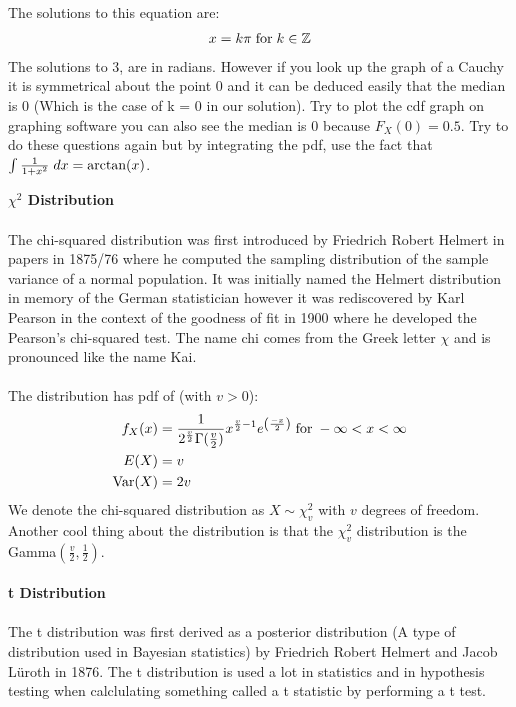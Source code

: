 \documentclass[,oneside]{article}
\begin{document}
\begin{enumerate}
\begin{enumerate}
The solutions to this equation are:
\begin{align*}
x = k\pi \hspace{0.1cm} \text{for} \hspace{0.1cm}k \in \mathbb{Z}
\end{align*}
The solutions to 3, are in radians. However if you look up the graph of a Cauchy it is symmetrical about the point 0 and it can be deduced easily that the median is 0 (Which is the case of k = 0 in our solution). Try to plot the cdf graph on graphing software you can also see the median is 0 because $F_X(0)=0.5$. Try to do these questions again but by integrating the pdf, use the fact that $\int \frac{1}{1+x^2}\hspace{0.1cm}dx=\text{arctan}(x)$.\\
\end{enumerate}
\textbf{$\chi^2$ Distribution}\\ \\
The chi-squared distribution was first introduced by Friedrich Robert Helmert in papers in 1875/76 where he computed the sampling distribution of the sample variance of a normal population. It was initially named the Helmert distribution in memory of the German statistician however it was rediscovered by Karl Pearson in the context of the goodness of fit in 1900 where he developed the Pearson's chi-squared test. The name chi comes from the Greek letter $\chi$ and is pronounced like the name Kai.\\ \\
The distribution has pdf of (with $v > 0$):
\begin{align*}
f_X(x) &= \frac{1}{2^{\frac{v}{2}}\Gamma(\frac{v}{2})}x^{\frac{v}{2}-1}e^{\left (\frac{-x}{2}\right ) } \hspace{0.1cm}\text{for}\hspace{0.1cm} -\infty < x < \infty \\
E(X)&= v\\
\text{Var}(X) &= 2v
\end{align*}
We denote the chi-squared distribution as $X \sim \chi_{v}^{2}$ with $v$ degrees of freedom. Another cool thing about the distribution is that the $\chi_{v}^{2}$ distribution is the Gamma$(\frac{v}{2},\frac{1}{2})$.\\ \\
\textbf{t Distribution}\\ \\
The t distribution was first derived as a posterior distribution (A type of distribution used in Bayesian statistics)  by Friedrich Robert Helmert  and Jacob Lüroth in 1876. The t distribution is used a lot in statistics and in hypothesis testing when calclulating something called a t statistic by performing a t test. \\ \\

\end{enumerate}
\end{document}
